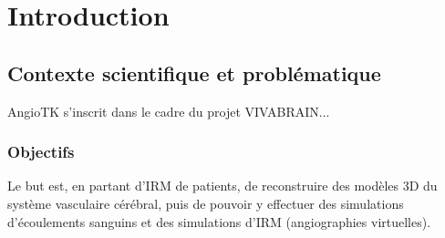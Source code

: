\chapter{Introduction}
\label{chap:intro}

\section{Contexte scientifique et problématique}

AngioTK s'inscrit dans le cadre du projet VIVABRAIN...

\subsection{Objectifs}

Le but est, en partant d'IRM de patients, de reconstruire des modèles 3D du système vasculaire cérébral, puis de pouvoir y effectuer des simulations d'écoulements sanguins et des simulations d'IRM (angiographies virtuelles).
